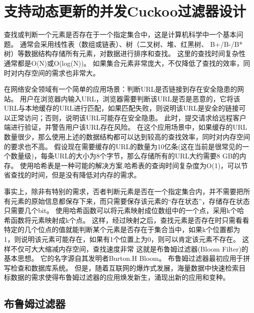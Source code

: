 \chapter{支持动态更新的并发Cuckoo过滤器设计}
查找或判断一个元素是否存在于一个指定集合中，这是计算机科学中一个基本问题。
通常会采用线性表（数组或链表）、树（二叉树、堆、红黑树、 B+/B-/B*树）等数据结构存储所有元素，对数据进行排序和查找。
这里的查找时间复杂性通常都是O(N)或O(log(N))。
如果集合元素非常庞大，不仅降低了查找的效率，同时对内存空间的需求也非常大。

在网络安全领域有一个简单的应用场景：判断URL是否链接到存在安全隐患的网站。
用户在浏览器内输入URL，浏览器需要判断该URL是否是恶意的，它将该URL与本地缓存的URL进行匹配，如果匹配失败，则说明该URL是安全的链接可以正常访问；否则，说明该URL可能存在安全隐患。
此时，提交请求给远程客户端进行验证，并警告用户该URL存在风险。
在这个应用场景中，如果缓存的URL数量很少，那么使用上述的数据结构都可以达到较高的查找效率，同时对内存空间的要求也不高。
假设现在需要缓存的URL的数量为10亿条(这在当前是很常见的一个数量级)，每条URL的大小为8个字节，那么存储所有的URL大约需要8 GB的内存。
使用哈希表是一种可能的解决方案.哈希表的查询时间复杂度为O(1)，可以节省查找的时间，但是没有降低对内存的需求。

事实上，除非有特别的需求，否者判断元素是否在一个指定集合内，并不需要把所有元素的原始信息都保存下来，而只需要保存该元素的“存在状态”，存储存在状态只需要几个bit。
使用哈希函数可以将元素映射成位数组中的一个点，采用k个哈希函数将元素映射成k个点。
这样，经过映射之后，查找元素是否存在时只需看看特定的几个位点的值就能判断某个元素是否存在于集合当中，如果k个位置都为1，则说明该元素可能存在，如果有1个位置上为0，则可以肯定该元素不存在。
这样不仅可大大缩减内存空间，查找速度非常
这就是布鲁姆过滤器(Bloom Filter)的基本思想。
它的名字源自其发明者Burton.H Bloom\cite{bloom1970space}。
布鲁姆过滤器最初应用于拼写检查和数据库系统。
但是，随着互联网的爆炸式发展，海量数据中快速检索目标数据的需求使得布鲁姆过滤器的应用焕发新生，涌现出新的应用和变种\cite{bender2012don,bonomi2006improved,song2005fast,yu2009buffalo}。

\section{布鲁姆过滤器}

